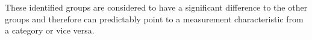 These identified groups are considered to have a significant difference to the other groups and therefore can predictably point to a measurement characteristic from a category or vice versa.



